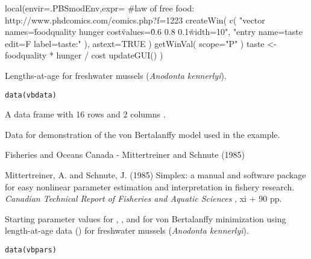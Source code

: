 \documentclass[letterpaper]{book}
\begin{document}
%
\begin{Examples}
\begin{ExampleCode}
local(envir=.PBSmodEnv,expr={
  #law of free food: http://www.phdcomics.com/comics.php?f=1223
  createWin( c( 
    "vector names=\"foodquality hunger cost\" values=\"0.6 0.8 0.1\" width=10",
    "entry name=taste edit=F label=taste:" ), astext=TRUE )
  getWinVal( scope="P" )
  taste <- foodquality * hunger / cost
  updateGUI()
})
\end{ExampleCode}
\end{Examples}
%
\begin{Description}\relax
Lengths-at-age for freshwater mussels (\emph{Anodonta kennerlyi}).
\end{Description}
%
\begin{Usage}
\begin{verbatim}
data(vbdata)
\end{verbatim}
\end{Usage}
%
\begin{Format}
A data frame with 16 rows and 2 columns .
\end{Format}
%
\begin{Details}\relax
Data for demonstration of the von Bertalanffy model used in the 
 example.
\end{Details}
%
\begin{Source}\relax
Fisheries and Oceans Canada - Mittertreiner and Schnute (1985)
\end{Source}
%
\begin{References}\relax
Mittertreiner, A. and Schnute, J. (1985) Simplex: a manual and software package 
for easy nonlinear parameter estimation and interpretation in fishery research. 
\emph{Canadian Technical Report of Fisheries and Aquatic Sciences} , xi + 90 pp. 
\end{References}
%
\begin{Description}\relax
Starting parameter values for , , and  for 
von Bertalanffy minimization using length-at-age data () 
for freshwater mussels (\emph{Anodonta kennerlyi}).
\end{Description}
%
\begin{Usage}
\begin{verbatim}
data(vbpars)
\end{verbatim}
\end{Usage}
\end{document}
